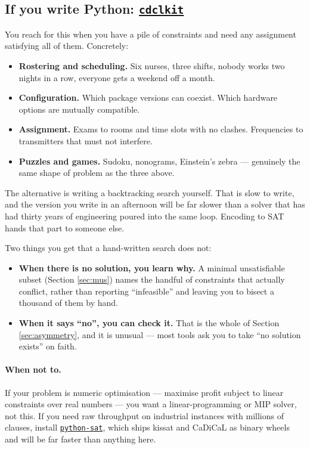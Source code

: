 \documentclass[11pt,a4paper]{article}
\newcommand{\pkg}[1]{\href{https://pypi.org/project/#1/}{\texttt{#1}}}
\begin{document}
\subsection*{If you write Python: \pkg{cdclkit}}

You reach for this when you have a pile of constraints and need any assignment
satisfying all of them. Concretely:

\begin{itemize}
\item \textbf{Rostering and scheduling.} Six nurses, three shifts, nobody works
      two nights in a row, everyone gets a weekend off a month.
\item \textbf{Configuration.} Which package versions can coexist. Which
      hardware options are mutually compatible.
\item \textbf{Assignment.} Exams to rooms and time slots with no clashes.
      Frequencies to transmitters that must not interfere.
\item \textbf{Puzzles and games.} Sudoku, nonograms, Einstein's zebra ---
      genuinely the same shape of problem as the three above.
\end{itemize}

The alternative is writing a backtracking search yourself. That is slow to
write, and the version you write in an afternoon will be far slower than a
solver that has had thirty years of engineering poured into the same loop.
Encoding to SAT hands that part to someone else.

Two things you get that a hand-written search does not:

\begin{itemize}
\item \textbf{When there is no solution, you learn why.} A minimal
      unsatisfiable subset (Section \ref{sec:mus}) names the handful of
      constraints that actually conflict, rather than reporting
      ``infeasible'' and leaving you to bisect a thousand of them by hand.
\item \textbf{When it says ``no'', you can check it.} That is the whole of
      Section \ref{sec:asymmetry}, and it is unusual --- most tools ask you to
      take ``no solution exists'' on faith.
\end{itemize}

\paragraph{When not to.} If your problem is numeric optimisation --- maximise
profit subject to linear constraints over real numbers --- you want a
linear-programming or MIP solver, not this. If you need raw throughput on
industrial instances with millions of clauses, install \pkg{python-sat}, which
ships kissat and CaDiCaL as binary wheels and will be far faster than anything
here.
\end{document}
